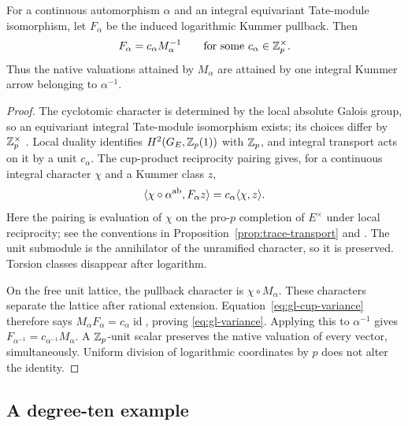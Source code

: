 \begin{proposition}
\label{prop:gl-variance}
For a continuous automorphism $\alpha$ and an integral equivariant
Tate-module isomorphism, let $F_\alpha$ be the induced logarithmic
Kummer pullback. Then
\begin{equation}\label{eq:gl-variance}
 F_\alpha=c_\alpha M_\alpha^{-1}
 \qquad\text{for some }c_\alpha\in\mathbb Z_p^\times.
\end{equation}
Thus the native valuations attained by $M_\alpha$ are attained by
one integral Kummer arrow belonging to $\alpha^{-1}$.
\end{proposition}
\begin{proof}
The cyclotomic character is determined by the local absolute Galois
group, so an equivariant integral Tate-module isomorphism exists;
its choices differ by $\mathbb Z_p^\times$
\cite[Proposition~1.1]{MochLocal}. Local duality identifies
$H^2(G_E,\mathbb Z_p(1))$ with $\mathbb Z_p$, and integral transport acts on it
by a unit $c_\alpha$. The cup-product reciprocity pairing gives,
for a continuous integral character $\chi$ and a Kummer class $z$,
\begin{equation}\label{eq:gl-cup-variance}
 \langle\chi\circ\alpha^{\rm ab},F_\alpha z\rangle
       =c_\alpha\langle\chi,z\rangle.
\end{equation}
Here the pairing is evaluation of $\chi$ on the pro-$p$ completion
of $E^\times$ under local reciprocity; see the conventions in
Proposition~\ref{prop:trace-transport} and
\cite[Chapter~III, Proposition~3.6 and \S4]{MilneCFT}.
The unit submodule is the annihilator of the unramified character,
so it is preserved. Torsion classes disappear after logarithm.

On the free unit lattice, the pullback character is $\chi\circ
M_\alpha$. These characters separate the lattice after rational
extension. Equation~\eqref{eq:gl-cup-variance} therefore says
$M_\alpha F_\alpha=c_\alpha\operatorname{id}$, proving
\eqref{eq:gl-variance}. Applying this to $\alpha^{-1}$ gives
$F_{\alpha^{-1}}=c_{\alpha^{-1}}M_\alpha$.
A $\mathbb Z_p$-unit scalar preserves the native valuation of every
vector, simultaneously. Uniform division of logarithmic coordinates
by $p$ does not alter the identity.
\end{proof}

\subsection{A degree-ten example}

